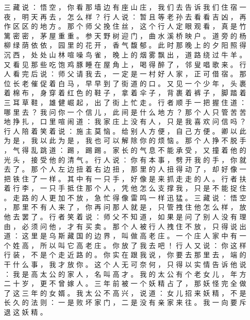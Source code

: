 {三 藏 说 ： 悟 空 ， 你 看 那 墙 边 有 座 山 庄 ， 我 们 去 告 诉 我 们 住 宿 一 夜 ， 明 天 再 去 ， 怎 么 样 ？ 行 人 说 ： 暂 且 等 老 孙 去 看 看 吉 凶 ， 再 作 区 区 的 地 方 。
那 个 师 父 挽 住 丝 ， 这 个 行 人 定 眼 观 看 ， 真 是 竹 篱 密 密 ， 茅 屋 重 重 。
参 天 野 树 迎 门 ， 曲 水 溪 桥 映 户 。
道 旁 的 杨 柳 绿 荫 依 依 ， 园 里 的 花 开 ， 香 气 馥 郁 。
此 时 那 晚 上 的 夕 阳 照 得 沉 西 ， 处 处 山 林 喧 噪 鸟 雀 ， 晚 上 的 烟 雾 飘 出 ， 道 路 绕 过 牛 羊 。
又 看 见 那 些 吃 饱 鸡 豚 睡 在 屋 角 上 ， 喝 得 醉 了 ， 邻 叟 唱 歌 来 。
行 人 看 完 后 说 ： 师 父 请 我 去 ， 一 定 是 一 村 好 人 家 ， 正 可 借 宿 。
那 位 长 老 催 促 着 白 马 ， 早 早 到 了 街 道 的 口 。
又 见 一 个 少 年 ， 头 裹 着 棉 布 ， 身 穿 着 红 色 的 鞋 子 ， 拿 着 伞 子 ， 背 裹 着 裤 子 ， 脚 踏 着 三 耳 草 鞋 ， 雄 健 崛 起 ， 出 了 街 上 忙 走 。
行 者 顺 手 一 把 握 住 道 ： 哪 里 去 ？ 我 问 你 一 个 信 儿 ， 此 间 是 什 么 地 方 ？ 那 个 人 只 管 苦 苦 地 挣 扎 ， 口 里 喧 闹 道 ： 我 家 庄 上 没 有 人 ， 只 是 我 喜 欢 问 信 吗 ？ 行 人 陪 着 笑 着 说 ： 施 主 莫 恼 。
给 别 人 方 便 ， 自 己 方 便 。
卿 以 此 为 是 ， 我 以 此 为 是 ， 我 也 可 以 解 除 你 的 烦 恼 。
那 个 人 挣 不 脱 手 ， 气 得 乱 跳 道 ： 踢 ， 踢 踢 。
家 长 的 气 息 不 能 承 受 ， 又 撞 着 他 的 光 头 ， 接 受 他 的 清 气 。
行 人 说 ： 你 有 本 事 ， 劈 开 我 的 手 ， 你 就 去 了 。
那 个 人 左 边 扭 着 右 边 扭 ， 那 里 的 人 扭 得 动 了 ， 却 好 像 一 把 铁 住 了 一 样 。
其 中 有 一 只 手 ， 好 像 是 来 抓 走 走 的 人 。
行 者 扶 着 行 李 ， 一 只 手 抵 住 那 个 人 ， 凭 他 怎 么 支 撑 我 ， 只 是 不 能 捉 住 。
走 路 的 人 更 加 不 放 ， 急 忙 得 像 雷 鸣 一 样 迅 猛 。
三 藏 说 ： 悟 空 ， 那 里 不 有 人 来 了 ， 你 再 问 那 人 就 是 ， 只 管 拽 住 他 怎 么 样 ， 放 他 去 罢 了 。
行 者 笑 着 说 ： 师 父 不 知 道 ， 如 果 是 问 了 别 人 没 有 理 由 ， 必 须 问 他 ， 才 有 买 卖 。
那 个 人 被 行 人 拽 住 不 放 ， 只 得 说 出 道 ： 这 里 是 乌 斯 藏 国 的 边 界 ， 叫 做 高 老 庄 。
一 个 庄 人 家 中 有 一 个 姓 高 ， 所 以 叫 它 高 老 庄 。
你 放 了 我 去 吧 ！
行 人 又 说 ： 你 这 样 行 装 ， 不 是 个 走 近 路 的 。
你 实 在 跟 我 说 ， 你 要 去 那 里 去 ， 端 的 干 什 么 事 ， 我 才 放 你 。
这 个 人 无 可 奈 何 ， 只 得 以 实 情 告 诉 他 说 ： 我 是 高 太 公 的 家 人 ， 名 叫 高 才 。
我 的 太 公 有 个 老 女 儿 ， 年 方 二 十 岁 ， 更 不 曾 嫁 人 。
三 年 前 被 一 个 妖 精 占 了 ， 那 妖 怪 完 全 做 了 这 三 年 的 女 婿 。
我 太 公 不 高 兴 ， 说 道 ： 女 儿 招 来 妖 精 ， 不 是 长 久 的 法 则 ： 一 是 败 坏 家 门 ， 二 是 没 有 亲 家 来 往 。
我 一 向 要 斥 退 这 妖 精 。
}
